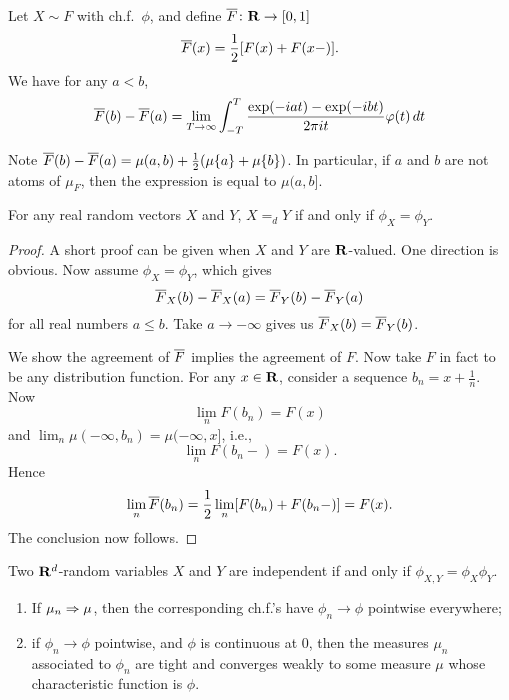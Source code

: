 \begin{namedthm}
    Let $X \sim F$ with ch.f.\ $\phi$, and define $\overline{F}\colon \mathbf{R} \to [0,1]$ \[
        \overline{F}(x) = \frac{1}{2}[F(x) + F(x-)].
    \]
    We have for any $a < b$, \[
         \overline{F}(b) - \overline{F}(a)= \lim_{T \to \infty} \int_{-T}^T \frac{\exp(-iat) - \exp(-ibt)}{2\pi it} \varphi(t)\,dt
    \]
\end{namedthm}
Note $\overline{F}(b) - \overline{F}(a) = \mu(a,b) + \frac{1}{2}(\mu\{a\}+\mu\{b\})$. In particular, if $a$ and $b$ are not atoms of $\mu_F$, then the expression is equal to $\mu(a,b]$.

\begin{thm}
    For any real random vectors $X$ and $Y$, $X=_d Y$ if and only if $\phi_X = \phi_Y$.
\end{thm}
\begin{proof}
    A short proof can be given when $X$ and $Y$ are $\mathbf{R}$-valued.
    One direction is obvious. Now assume $\phi_X = \phi_Y$, which gives \[
        \overline{F}_X(b) - \overline{F}_X(a) = \overline{F}_Y(b) - \overline{F}_Y(a)
    \] for all real numbers $a \leq b$. Take $a \to -\infty$ gives us $\overline{F}_X(b) = \overline{F}_Y(b)$.
    
    We show the agreement of $\overline{F}$ implies the agreement of $F$. Now take $F$ in fact to be any distribution function.
    For any $x\in \mathbf{R}$, consider a sequence $b_n = x+ \frac{1}{n}$. Now \[
        \lim_{n} F(b_n) = F(x)
    \] and $
        \lim_{n} \mu(-\infty, b_n) = \mu(-\infty, x]
    $, i.e., \[\lim_n F(b_n - ) = F(x).\] Hence \[
        \lim_{n} \overline{F}(b_n) = \frac{1}{2} \lim_{n} [F(b_n) + F(b_n-)] = F(x).
    \] The conclusion now follows.
\end{proof}

\begin{cor}
    Two $\mathbf{R}^d$-random variables $X$ and $Y$ are independent if and only if $\phi_{X,Y} = \phi_X \phi_Y$.
\end{cor}

\begin{thm} \leavevmode
    \begin{enumerate}
        \item If $\mu_n \Rightarrow \mu$, then the corresponding ch.f.'s have $\phi_n \to \phi$ pointwise everywhere;
        \item if $\phi_n \to \phi$ pointwise, and $\phi$ is continuous at $0$, then the measures $\mu_n$ associated to $\phi_n$ are tight and converges weakly to some measure $\mu$ whose characteristic function is $\phi$.
    \end{enumerate}
\end{thm}

